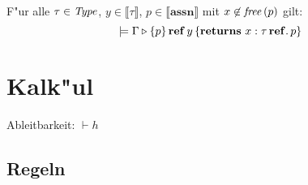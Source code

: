 \documentclass[12pt,a4paper,bigheadings]{scrartcl}
\newcommand{\semantic}[1]{\ensuremath{\llbracket#1\rrbracket}}
\newcommand{\assn}{\ensuremath{\mathbf{assn}}}
\begin{document}
\begin{lemma}
  F"ur alle $\tau\in{\text{\it Type\/}}$, $y\in\semantic{\tau}$, $p \in \semantic{\assn}$ mit
  $x \not \in {\text{\it free\/}}\,(p)$ gilt:
  \[
    \models \Gamma \triangleright \{p\}\,\mathbf{ref}\,y\,\{{\bf returns}\ x:\tau\,\mathbf{ref}.\, p\}
  \]
\end{lemma}


\section{Kalk"ul}

Ableitbarkeit: $\vdash h$

\subsection{Regeln}
\end{document}
